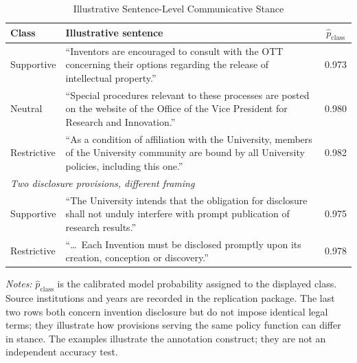 \begin{table}[htbp]
\centering
\small
\caption{Illustrative Sentence-Level Communicative Stance}
\label{tab:examples}
\begin{threeparttable}
\begin{tabular}{p{}p{}c}
\toprule
Class & Illustrative sentence & $\hat p_{\text{class}}$ \\
\midrule
Supportive & ``Inventors are encouraged to consult with the OTT concerning their options regarding the release of intellectual property.'' & 0.973 \\
Neutral & ``Special procedures relevant to these processes are posted on the website of the Office of the Vice President for Research and Innovation.'' & 0.980 \\
Restrictive & ``As a condition of affiliation with the University, members of the University community are bound by all University policies, including this one.'' & 0.982 \\
\midrule
\multicolumn{3}{l}{\textit{Two disclosure provisions, different framing}} \\
Supportive & ``The University intends that the obligation for disclosure shall not unduly interfere with prompt publication of research results.'' & 0.975 \\
Restrictive & ``\ldots\ Each Invention must be disclosed promptly upon its creation, conception or discovery.'' & 0.978 \\
\bottomrule
\end{tabular}
\begin{tablenotes}[flushleft]\footnotesize
\item \textit{Notes:} $\hat p_{\text{class}}$ is the calibrated model probability assigned to the displayed class. Source institutions and years are recorded in the replication package. The last two rows both concern invention disclosure but do not impose identical legal terms; they illustrate how provisions serving the same policy function can differ in stance. The examples illustrate the annotation construct; they are not an independent accuracy test.
\end{tablenotes}
\end{threeparttable}
\end{table}
